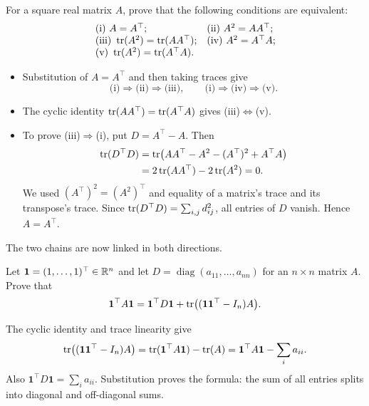 \begin{problem}\label{ex:02:bapat-1-11}
For a square real matrix $A$, prove that the following conditions are equivalent:
\[
\begin{array}{ll}
\text{(i)}\ A=A^\top;&\text{(ii)}\ A^2=AA^\top;\\
\text{(iii)}\ \operatorname{tr}(A^2)=\operatorname{tr}(AA^\top);&\text{(iv)}\ A^2=A^\top A;\\
\text{(v)}\ \operatorname{tr}(A^2)=\operatorname{tr}(A^\top A).&
\end{array}
\]
\end{problem}
\begin{solution}
\begin{itemize}
\item Substitution of $A=A^\top$ and then taking traces give
\[
\text{(i)}\Longrightarrow\text{(ii)}\Longrightarrow\text{(iii)},\qquad
\text{(i)}\Longrightarrow\text{(iv)}\Longrightarrow\text{(v)}.
\]
\item The cyclic identity $\operatorname{tr}(AA^\top)=\operatorname{tr}(A^\top A)$ gives
(iii)$\Longleftrightarrow$(v).
\item To prove (iii)$\Longrightarrow$(i), put $D=A^\top-A$. Then
\begin{align*}
\operatorname{tr}(D^\top D)
 &=\operatorname{tr}\bigl(AA^\top-A^2-(A^\top)^2+A^\top A\bigr)\\
 &=2\operatorname{tr}(AA^\top)-2\operatorname{tr}(A^2)=0.
\end{align*}
We used $(A^\top)^2=(A^2)^\top$ and equality of a matrix's trace and its
transpose's trace. Since $\operatorname{tr}(D^\top D)=\sum_{i,j}d_{ij}^2$,
all entries of $D$ vanish. Hence $A=A^\top$.
\end{itemize}
The two chains are now linked in both directions.
\end{solution}

\begin{problem}\label{ex:02:trace-sums}
Let $\mathbf1=(1,\ldots,1)^\top\in\mathbb R^n$ and let
$D=\operatorname{diag}(a_{11},\ldots,a_{nn})$ for an $n\times n$ matrix $A$.
Prove that
\[
\mathbf1^\top A\mathbf1
=\mathbf1^\top D\mathbf1+\operatorname{tr}\bigl((\mathbf1\mathbf1^\top-I_n)A\bigr).
\]
\end{problem}
\begin{solution}
The cyclic identity and trace linearity give
\[
\operatorname{tr}\bigl((\mathbf1\mathbf1^\top-I_n)A\bigr)
=\operatorname{tr}(\mathbf1^\top A\mathbf1)-\operatorname{tr}(A)
=\mathbf1^\top A\mathbf1-\sum_i a_{ii}.
\]
Also $\mathbf1^\top D\mathbf1=\sum_i a_{ii}$. Substitution proves the formula:
the sum of all entries splits into diagonal and off-diagonal sums.
\end{solution}

